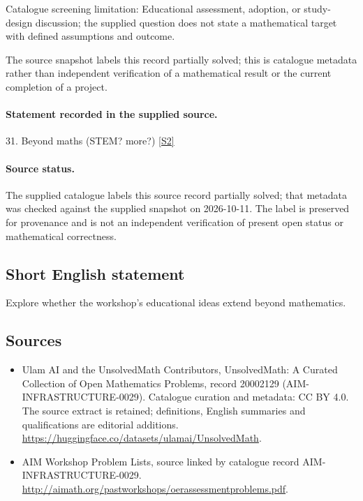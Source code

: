 \documentclass[11pt]{article}
\begin{document}
Catalogue screening limitation: Educational assessment, adoption, or study-design discussion; the supplied question does not state a mathematical target with defined assumptions and outcome.

The source snapshot labels this record partially solved; this is catalogue metadata rather than independent verification of a mathematical result or the current completion of a project.
\paragraph{Statement recorded in the supplied source.}
31. Beyond maths (STEM? more?) \href{http://aimath.org/pastworkshops/oerassessmentproblems.pdf}{[S2]}
\paragraph{Source status.}
The supplied catalogue labels this source record partially solved; that metadata was checked against the supplied snapshot on 2026-10-11. The label is preserved for provenance and is not an independent verification of present open status or mathematical correctness.
\subsection{Short English statement}
Explore whether the workshop's educational ideas extend beyond mathematics.
\subsection{Sources}
\begin{itemize}
\item[S1] Ulam AI and the UnsolvedMath Contributors, UnsolvedMath: A Curated Collection of Open Mathematics Problems, record 20002129 (AIM-INFRASTRUCTURE-0029). Catalogue curation and metadata: CC BY 4.0. The source extract is retained; definitions, English summaries and qualifications are editorial additions.
\url{https://huggingface.co/datasets/ulamai/UnsolvedMath}.
\item[S2] AIM Workshop Problem Lists, source linked by catalogue record AIM-INFRASTRUCTURE-0029.
\url{http://aimath.org/pastworkshops/oerassessmentproblems.pdf}.
\end{itemize}
\end{document}
